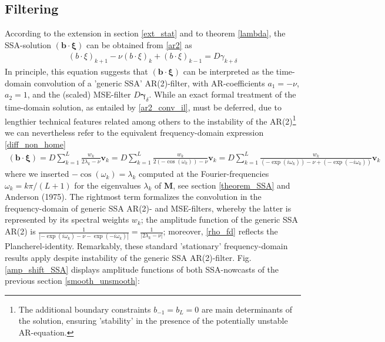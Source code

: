 \documentclass[a4paper]{article}
\begin{document}
\subsection{Filtering}\label{conv_amp}



According to the extension in section \ref{ext_stat} and to theorem \ref{lambda}, the SSA-solution $(\mathbf{b}\cdot\boldsymbol{\xi})$ can be obtained from \ref{ar2} as
\begin{eqnarray}\label{ar2_conv_il}
(b\cdot\xi)_{k+1}-\nu(b\cdot\xi)_{k}+(b\cdot\xi)_{k-1}=D\gamma_{k+\delta}
\end{eqnarray}
In principle, this equation suggests that $(\mathbf{b}\cdot\boldsymbol{\xi})$ can be interpreted as the time-domain convolution of a 'generic SSA' AR(2)-filter, with AR-coefficients $a_1=-\nu$, $a_2=1$, and the (scaled) MSE-filter $D\boldsymbol{\gamma}_{\delta}$. While an exact formal treatment of the time-domain solution, as entailed by \ref{ar2_conv_il}, must be deferred, due to lengthier technical features related among others to the instability of the AR(2)\footnote{The additional boundary constraints $b_{-1}=b_L=0$ are main determinants of the solution, ensuring 'stability' in the presence of the potentially unstable AR-equation.} we can nevertheless refer to the equivalent frequency-domain expression \ref{diff_non_home}
\begin{eqnarray*}
(\mathbf{b}\cdot\boldsymbol{\xi})=D\sum_{k=1}^L \frac{w_k}{2\lambda_{k}-\nu}\mathbf{v}_{k}=D\sum_{k=1}^L \frac{w_k}{2(-\cos(\omega_k))-\nu}\mathbf{v}_{k}=D\sum_{k=1}^L \frac{w_k}{(-\exp(i\omega_k))-\nu+(-\exp(-i\omega_k))}\mathbf{v}_{k}
\end{eqnarray*}
where we inserted $-\cos(\omega_k)=\lambda_k$ computed at the Fourier-frequencies $\omega_k=k\pi /(L+1)$ for the eigenvalues $\lambda_k$ of $\mathbf{M}$, see section \ref{theorem_SSA} and Anderson (1975). The rightmost term formalizes the convolution in the frequency-domain of generic SSA AR(2)- and MSE-filters, whereby the latter is represented by its spectral weights $w_k$; the amplitude function of the generic SSA AR(2) is $\frac{1}{|-\exp(i\omega_k)-\nu-\exp(-i\omega_k)|}=\frac{1}{|2\lambda_{k}-\nu|}$; moreover, \ref{rho_fd} reflects the Plancherel-identity. Remarkably, these standard 'stationary' frequency-domain results apply despite instability of the generic SSA AR(2)-filter. Fig.\ref{amp_shift_SSA} displays amplitude functions of both SSA-nowcasts of the previous section \ref{smooth_unsmooth}: %
\end{document}
